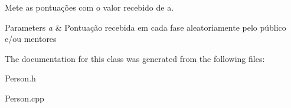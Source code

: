 Mete as pontuações com o valor recebido de a. 


\begin{DoxyParams}{Parameters}
{\em a} & Pontuação recebida em cada fase aleatoriamente pelo público e/ou mentores \\
\hline
\end{DoxyParams}


The documentation for this class was generated from the following files\+:\begin{DoxyCompactItemize}
\item 
Person.\+h\item 
Person.\+cpp\end{DoxyCompactItemize}
